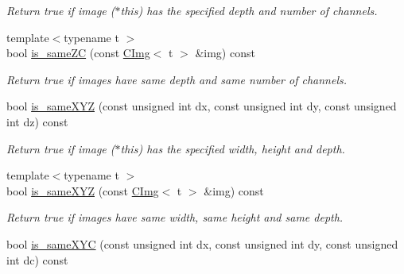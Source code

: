 \begin{DoxyCompactItemize}
\begin{DoxyCompactList}\small\item\em Return {\ttfamily true} if image ($\ast$this) has the specified depth and number of channels. \item\end{DoxyCompactList}\item 
\hypertarget{structcimg__library_1_1CImg_ae287890d736b4f1623562a144d15b7b5}{
{\footnotesize template$<$typename t $>$ }\\bool \hyperlink{structcimg__library_1_1CImg_ae287890d736b4f1623562a144d15b7b5}{is\_\-sameZC} (const \hyperlink{structcimg__library_1_1CImg}{CImg}$<$ t $>$ \&img) const }
\label{structcimg__library_1_1CImg_ae287890d736b4f1623562a144d15b7b5}

\begin{DoxyCompactList}\small\item\em Return {\ttfamily true} if images have same depth and same number of channels. \item\end{DoxyCompactList}\item 
\hypertarget{structcimg__library_1_1CImg_a36a12bf20a1d6cf863f505877e30bdce}{
bool \hyperlink{structcimg__library_1_1CImg_a36a12bf20a1d6cf863f505877e30bdce}{is\_\-sameXYZ} (const unsigned int dx, const unsigned int dy, const unsigned int dz) const }
\label{structcimg__library_1_1CImg_a36a12bf20a1d6cf863f505877e30bdce}

\begin{DoxyCompactList}\small\item\em Return {\ttfamily true} if image ($\ast$this) has the specified width, height and depth. \item\end{DoxyCompactList}\item 
\hypertarget{structcimg__library_1_1CImg_a0fbd732196771e98d2d3418eb03f1d77}{
{\footnotesize template$<$typename t $>$ }\\bool \hyperlink{structcimg__library_1_1CImg_a0fbd732196771e98d2d3418eb03f1d77}{is\_\-sameXYZ} (const \hyperlink{structcimg__library_1_1CImg}{CImg}$<$ t $>$ \&img) const }
\label{structcimg__library_1_1CImg_a0fbd732196771e98d2d3418eb03f1d77}

\begin{DoxyCompactList}\small\item\em Return {\ttfamily true} if images have same width, same height and same depth. \item\end{DoxyCompactList}\item 
\hypertarget{structcimg__library_1_1CImg_a0f54160bf0c8ce15b34894eade2e129c}{
bool \hyperlink{structcimg__library_1_1CImg_a0f54160bf0c8ce15b34894eade2e129c}{is\_\-sameXYC} (const unsigned int dx, const unsigned int dy, const unsigned int dc) const }
\label{structcimg__library_1_1CImg_a0f54160bf0c8ce15b34894eade2e129c}


\end{DoxyCompactItemize}
